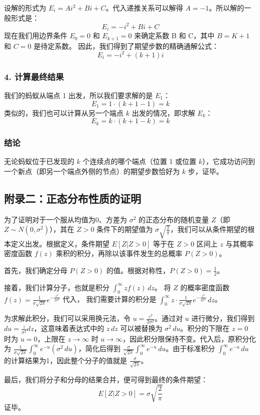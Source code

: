 \documentclass[UTF8]{ctexart}
\begin{document}
设解的形式为 $E_i = A i^2 + B i + C$。代入递推关系可以解得 $A=-1$。所以解的一般形式是：
\[ E_i = -i^2 + Bi + C \]
现在我们用边界条件 $E_0 = 0$ 和 $E_{k+1} = 0$ 来确定系数 B 和 C，其中 $B=K+1$ 和 $C=0$ 是待定系数。
因此，我们得到了期望步数的精确通解公式：
\[ E_i = -i^2 + (k+1)i  \]

\subsubsection*{4. 计算最终结果}
我们的蚂蚁从端点 1 出发，所以我们要求解的是 $E_1$：
\[ E_1 = 1 \cdot (k+1-1) = k \]
类似的，我们也可以计算从另一个端点 $k$ 出发的情况，即求解 $E_k$：
\[ E_k = k \cdot (k+1-k) = k \]

\subsubsection*{结论}
无论蚂蚁位于已发现的 $k$ 个连续点的哪个端点（位置 1 或位置 $k$），它成功访问到一个新点（即另一个端点外侧的节点）的期望步数恰好为 $k$ 步，证毕。


\subsection*{附录二：正态分布性质的证明}
为了证明对于一个服从均值为0、方差为 $\sigma^2$ 的正态分布的随机变量 $Z$（即 $Z \sim N(0, \sigma^2)$），其在 $Z>0$ 条件下的期望值为 $\sigma \sqrt{\frac{2}{\pi}}$，我们可以从条件期望的根本定义出发。根据定义，条件期望 $E[Z | Z>0]$ 等于在 $Z>0$ 区间上 $z$ 与其概率密度函数 $f(z)$ 乘积的积分，再除以该事件发生的总概率 $P(Z>0)$。

首先，我们确定分母 $P(Z>0)$ 的值。根据对称性，$P(Z>0) = \frac{1}{2}$。

接着，我们计算分子，也就是积分 $\int_{0}^{\infty} z f(z) \,dz$。
将 $Z$ 的概率密度函数 $f(z) = \frac{1}{\sigma\sqrt{2\pi}} e^{-\frac{z^2}{2\sigma^2}}$ 代入，
我们需要计算的积分是 $\int_{0}^{\infty} z \cdot \frac{1}{\sigma\sqrt{2\pi}} e^{-\frac{z^2}{2\sigma^2}} \,dz$。

为求解此积分，我们可以采用换元法，令 $u = \frac{z^2}{2\sigma^2}$。通过对 $u$ 进行微分，我们得到 $du = \frac{z}{\sigma^2} dz$，这意味着表达式中的 $z \,dz$ 可以被替换为 $\sigma^2 \,du$。积分的下限在 $z=0$ 时为 $u=0$，上限在 $z \to \infty$ 时 $u \to \infty$，因此积分限保持不变。代入后，原积分化为 $\frac{1}{\sigma\sqrt{2\pi}} \int_{0}^{\infty} e^{-u} (\sigma^2 \,du)$，简化后得到 $\frac{\sigma}{\sqrt{2\pi}} \int_{0}^{\infty} e^{-u} \,du$。由于标准积分 $\int_{0}^{\infty} e^{-u} \,du$ 的计算结果为1，因此整个分子的值就是 $\frac{\sigma}{\sqrt{2\pi}}$。

最后，我们将分子和分母的结果合并，便可得到最终的条件期望：
$$
E[Z | Z>0] = \sigma \sqrt{\frac{2}{\pi}}
$$
证毕。
\end{document}
